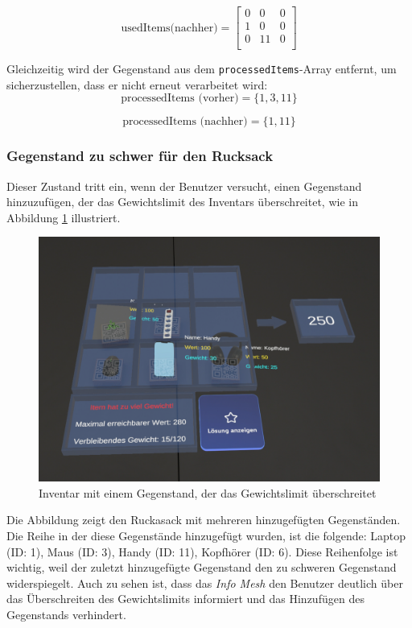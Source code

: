 \[
\text{usedItems(nachher)} =
\left[
\begin{array}{ccccc}
0 & 0 & 0 \\
1 & 0 & 0 \\
0 & 11 & 0 \\
\end{array}
\right]
\]

Gleichzeitig wird der Gegenstand aus dem \texttt{processedItems}-Array entfernt, um sicherzustellen, dass er nicht
erneut verarbeitet wird:
\[
\text{processedItems (vorher)} = \{1, 3, 11\}
\]

\[
\text{processedItems (nachher)} = \{1, 11\}
\]

\subsubsection*{Gegenstand zu schwer für den Rucksack}
Dieser Zustand tritt ein, wenn der Benutzer versucht, einen Gegenstand hinzuzufügen, der das Gewichtslimit des Inventars
überschreitet, wie in Abbildung \ref{fig:controller_itemTooHeavy} illustriert.

\begin{figure}[H]
    \centering
    \includegraphics[width=\textwidth]{images/itemToHeavy}
    \caption{Inventar mit einem Gegenstand, der das Gewichtslimit überschreitet}
    \label{fig:controller_itemTooHeavy}
\end{figure}

Die Abbildung zeigt den Ruckasack mit mehreren hinzugefügten Gegenständen. Die Reihe in der diese Gegenstände
hinzugefügt wurden, ist die folgende: Laptop (ID: 1), Maus (ID: 3), Handy (ID: 11), Kopfhörer (ID: 6). Diese Reihenfolge
ist wichtig, weil der zuletzt hinzugefügte Gegenstand den zu schweren Gegenstand widerspiegelt. Auch zu sehen ist, dass
das \textit{Info Mesh} den Benutzer deutlich über das Überschreiten des Gewichtslimits informiert und das Hinzufügen
des Gegenstands verhindert.

